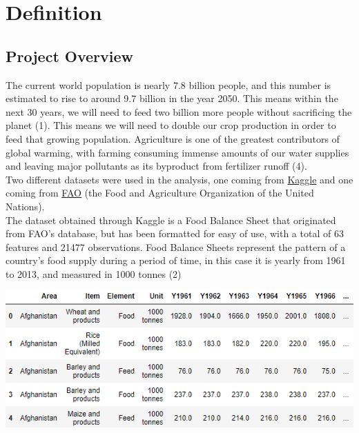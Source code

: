 \documentclass[12pt, a4paper]{article}
\begin{document}
\begin{spacing}{1.1}
	\begin{titlepage}
		\vspace*{3cm}
		\renewcommand*\contentsname{Table of Contents}
		\tableofcontents
	\end{titlepage} \newpage


	\section{Definition}
	\subsection{Project Overview}
	The current world population is nearly 7.8 billion people, and this number is estimated to rise to around 9.7 billion in the year 2050. This means within the next 30 years, we will need to feed two billion more people without sacrificing the planet (1). This means we will need to double our crop production in order to feed that growing population. Agriculture is one of the greatest contributors of global warming, with farming consuming immense amounts of our water supplies and leaving major pollutants as its byproduct from fertilizer runoff (4). \vspace*{2mm}\\	
	Two different datasets were used in the analysis, one coming from \href{https://www.kaggle.com/dorbicycle/world-foodfeed-production}{Kaggle} and one coming from \href{http://www.fao.org/faostat/en/#data/OA}{FAO} (the Food and Agriculture Organization of the United Nations).\vspace*{2mm}\\	
	The dataset obtained through Kaggle is a Food Balance Sheet that originated from FAO's database, but has been formatted for easy of use, with a total of 63 features and 21477 observations. Food Balance Sheets represent the pattern of a country's food supply during a period of time, in this case it is yearly from 1961 to 2013, and measured in 1000 tonnes (2)
	\begin{center}	\includegraphics[scale=.9]{food_data}	\end{center}

\end{spacing}
\end{document}
